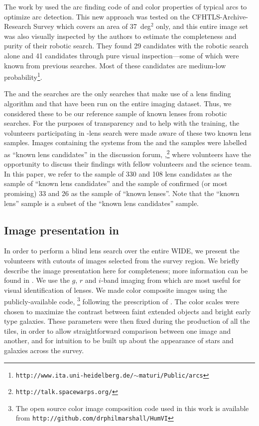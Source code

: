 \documentclass[useAMS,usenatbib,a4paper]{mn2e}
\begin{document}
The work by \citet{Maturi2014} used the arc finding code of
\citet{Seidel2007} and color properties of typical arcs to optimize arc
detection. This new approach was tested on the CFHTLS-Archive-Research
Survey \citep[CARS,][]{Erben2009} which covers an area of 37~deg$^2$
only, and this entire image set was also visually inspected by the authors to
estimate the completeness and purity of their robotic search. They found 29
candidates with the robotic search alone and 41 candidates through pure
visual inspection---some of which were known from previous searches. Most
of these candidates are medium-low
probability\footnote{\texttt{http://www.ita.uni-heidelberg.de/$\sim$maturi/Public/arcs}}.

The \rf and the \af searches are the only searches that make use of a
lens finding algorithm and that have been run on the entire \cfhtls
imaging dataset.  Thus, we considered these to be our reference sample of known
lenses from robotic searches. For the purposes of transparency and to
help with the training, the volunteers participating in \sw-\cfhtls lens
search were made aware of these two known lens samples. Images
containing the systems from the \rf and the \af samples were labelled as
``known lens candidates'' in the \sw discussion forum,
\Talk,\footnote{\texttt{http://talk.spacewarps.org/}} where volunteers have the
opportunity to discuss their findings with fellow volunteers and the
science team. In this paper, we refer to the sample of 330 \rf and 108
\af lens candidates as the sample of ``known lens candidates'' and the
sample of confirmed (or most promising) 33 \rf and 26 \af as the sample
of ``known lenses''. Note that the ``known lens'' sample is a subset of
the ``known lens candidates'' sample.


\subsection{Image presentation in \sw}
\label{sec:data:impres}

In order to perform a blind lens search over the entire \cfhtls
WIDE, we present the volunteers with cutouts of images selected
from the survey region. We briefly describe the image presentation here
for completeness; more information can be found in \PaperOne. We use
the $g$, $r$ and $i$-band imaging from \cfhtls which are most useful for
visual identification of lenses.  We made color composite images using
the publicly-available code, \humvi\footnote{The open source  color image
composition code used in this work is available from
\texttt{http://github.com/drphilmarshall/HumVI}} following the
prescription of \citet{Lupton2004}. The color scales were chosen to
maximize the contrast between faint extended objects and bright early
type galaxies. These parameters
were then fixed during the production of all the tiles, in order to allow
straightforward comparison between one image and another, and for
intuition to be built up about the appearance of stars and galaxies
across the survey.
\end{document}
